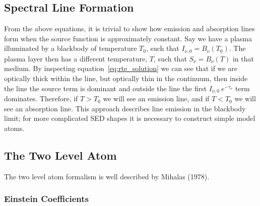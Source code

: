 
\subsection{Spectral Line Formation}

From the above equations, it is trivial to show how emission and absorption lines form when
the source function is approximately constant.
Say we have a plasma illuminated by a blackbody of temperature $T_0$, such that
$I_{\nu,0} = B_\nu (T_0)$. The plasma layer then has a different temperature, $T$,
such that $S_\nu = B_\nu (T)$ in that medium. By inspecting equation~\ref{eq:rte_solution}
we can see that if we are optically thick within the line, but optically
thin in the continuum, then inside the line the source term is dominant and outside 
the line the first $I_{\nu,0}~e^{-\tau_\nu}$ term dominates. Therefore, if $T > T_0$ we will 
see an emission line, and if $T < T_0$ we will see an absorption line. 
This approach describes line emission in the blackbody limit; for more complicated SED shapes
it is necessary to construct simple model atoms.

\subsection{The Two Level Atom}

The two level atom formalism is well described by Mihalas (1978). 


\subsubsection{Einstein Coefficients}

